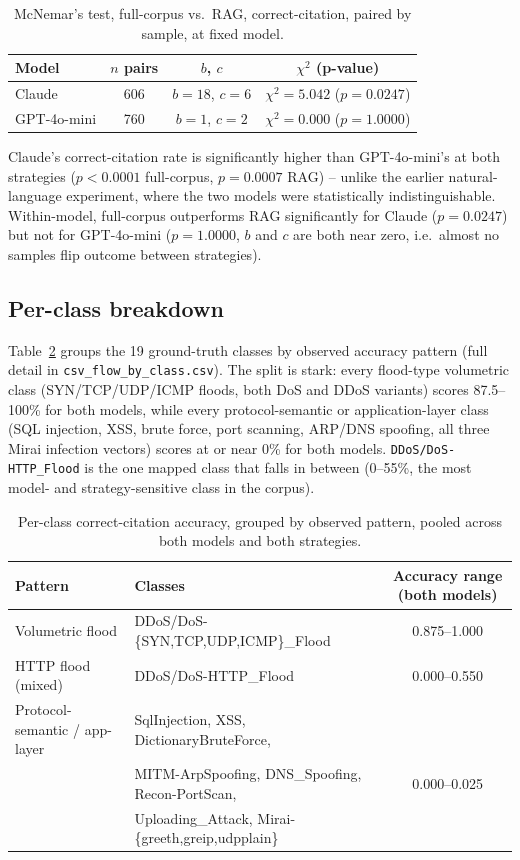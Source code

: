 \documentclass[11pt]{article}
\begin{document}
\begin{table}[h]
\centering
\small
\begin{tabular}{lccc}
\toprule
\textbf{Model} & \textbf{$n$ pairs} & \textbf{$b$, $c$} & \textbf{$\chi^2$ (p-value)} \\
\midrule
Claude & 606 & $b{=}18$, $c{=}6$ & $\chi^2{=}5.042$ ($p{=}0.0247$) \\
GPT-4o-mini & 760 & $b{=}1$, $c{=}2$ & $\chi^2{=}0.000$ ($p{=}1.0000$) \\
\bottomrule
\end{tabular}
\caption{McNemar's test, full-corpus vs.\ RAG, correct-citation, paired by
sample, at fixed model.}
\label{tab:mcnemar-strategy}
\end{table}

Claude's correct-citation rate is significantly higher than GPT-4o-mini's
at both strategies ($p{<}0.0001$ full-corpus, $p{=}0.0007$ RAG) -- unlike
the earlier natural-language experiment, where the two models were
statistically indistinguishable. Within-model, full-corpus outperforms RAG
significantly for Claude ($p{=}0.0247$) but not for GPT-4o-mini
($p{=}1.0000$, $b$ and $c$ are both near zero, i.e.\ almost no samples flip
outcome between strategies).

\subsection{Per-class breakdown}

Table~\ref{tab:byclass} groups the 19 ground-truth classes by observed
accuracy pattern (full detail in \texttt{csv\_flow\_by\_class.csv}). The
split is stark: every flood-type volumetric class (SYN/TCP/UDP/ICMP floods,
both DoS and DDoS variants) scores 87.5--100\% for both models, while every
protocol-semantic or application-layer class (SQL injection, XSS, brute
force, port scanning, ARP/DNS spoofing, all three Mirai infection vectors)
scores at or near 0\% for both models. \texttt{DDoS/DoS-HTTP\_Flood} is the
one mapped class that falls in between (0--55\%, the most model- and
strategy-sensitive class in the corpus).

\begin{table}[h]
\centering
\small
\begin{tabular}{llc}
\toprule
\textbf{Pattern} & \textbf{Classes} & \textbf{Accuracy range (both models)} \\
\midrule
Volumetric flood & DDoS/DoS-\{SYN,TCP,UDP,ICMP\}\_Flood & 0.875--1.000 \\
HTTP flood (mixed) & DDoS/DoS-HTTP\_Flood & 0.000--0.550 \\
Protocol-semantic / app-layer & SqlInjection, XSS, DictionaryBruteForce, & \\
 & MITM-ArpSpoofing, DNS\_Spoofing, Recon-PortScan, & 0.000--0.025 \\
 & Uploading\_Attack, Mirai-\{greeth,greip,udpplain\} & \\
\bottomrule
\end{tabular}
\caption{Per-class correct-citation accuracy, grouped by observed pattern,
pooled across both models and both strategies.}
\label{tab:byclass}
\end{table}
\end{document}
